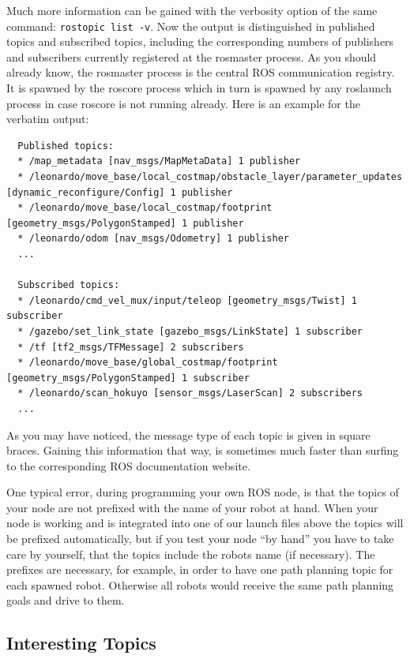 Much more information can be gained with the verbosity option of the same command: \verb$rostopic list -v$. Now the output is distinguished in published topics and subscribed topics, including the corresponding numbers of publishers and subscribers currently registered at the rosmaster process. As you should already know, the rosmaster process is the central ROS communication registry. It is spawned by the roscore process which in turn is spawned by any roslaunch process in case roscore is not running already. Here is an example for the verbatim output:

\begin{verbatim}
  Published topics:
  * /map_metadata [nav_msgs/MapMetaData] 1 publisher
  * /leonardo/move_base/local_costmap/obstacle_layer/parameter_updates [dynamic_reconfigure/Config] 1 publisher
  * /leonardo/move_base/local_costmap/footprint [geometry_msgs/PolygonStamped] 1 publisher
  * /leonardo/odom [nav_msgs/Odometry] 1 publisher
  ...
  
  Subscribed topics:
  * /leonardo/cmd_vel_mux/input/teleop [geometry_msgs/Twist] 1 subscriber
  * /gazebo/set_link_state [gazebo_msgs/LinkState] 1 subscriber
  * /tf [tf2_msgs/TFMessage] 2 subscribers
  * /leonardo/move_base/global_costmap/footprint [geometry_msgs/PolygonStamped] 1 subscriber
  * /leonardo/scan_hokuyo [sensor_msgs/LaserScan] 2 subscribers
  ...
\end{verbatim}

As you may have noticed, the message type of each topic is given in square braces. Gaining this information that way, is sometimes much faster than surfing to the corresponding ROS documentation website.

One typical error, during programming your own ROS node, is that the topics of your node are not prefixed with the name of your robot at hand. When your node is working and is integrated into one of our launch files above the topics will be prefixed automatically, but if you test your node ``by hand'' you have to take care by yourself, that the topics include the robots name (if necessary). The prefixes are necessary, for example, in order to have one path planning topic for each spawned robot. Otherwise all robots would receive the same path planning goals and drive to them. 

\subsection{Interesting Topics}
\label{ssec:InterestingTopics}


